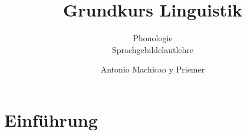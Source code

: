 
\title{\textbf{Grundkurs Linguistik}}

\subtitle{Phonologie\\Sprachgebildelautlehre}

\author[aMyP]{
	{\small Antonio Machicao y Priemer}
}


\date{ }





\begin{frame}
  \HUtitle
\end{frame}



\nocite{Repp&Co12a} 
\nocite{Hall00a} 
\nocite{Luedeling09a} 
\nocite{Ramers08a}

%
\section{Einführung}
%

